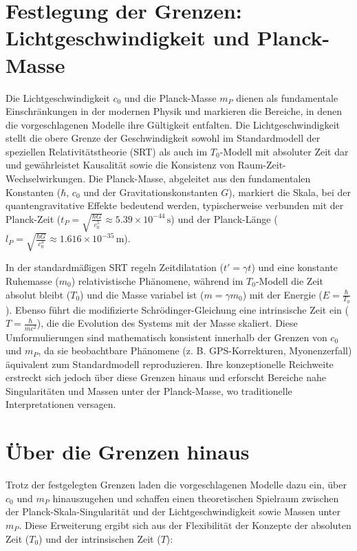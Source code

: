 \documentclass[a4paper,12pt]{article}
\begin{document}
	\section{Festlegung der Grenzen: Lichtgeschwindigkeit und Planck-Masse}
	Die Lichtgeschwindigkeit \( c_0 \) und die Planck-Masse \( m_P \) dienen als fundamentale Einschränkungen in der modernen Physik und markieren die Bereiche, in denen die vorgeschlagenen Modelle ihre Gültigkeit entfalten. Die Lichtgeschwindigkeit stellt die obere Grenze der Geschwindigkeit sowohl im Standardmodell der speziellen Relativitätstheorie (SRT) als auch im \( T_0 \)-Modell mit absoluter Zeit dar und gewährleistet Kausalität sowie die Konsistenz von Raum-Zeit-Wechselwirkungen. Die Planck-Masse, abgeleitet aus den fundamentalen Konstanten (\( \hbar \), \( c_0 \) und der Gravitationskonstanten \( G \)), markiert die Skala, bei der quantengravitative Effekte bedeutend werden, typischerweise verbunden mit der Planck-Zeit (\( t_P = \sqrt{\frac{\hbar G}{c_0^5}} \approx 5.39 \times 10^{-44} \, \text{s} \)) und der Planck-Länge (\( l_P = \sqrt{\frac{\hbar G}{c_0^3}} \approx 1.616 \times 10^{-35} \, \text{m} \)).
	
	In der standardmäßigen SRT regeln Zeitdilatation (\( t' = \gamma t \)) und eine konstante Ruhemasse (\( m_0 \)) relativistische Phänomene, während im \( T_0 \)-Modell die Zeit absolut bleibt (\( T_0 \)) und die Masse variabel ist (\( m = \gamma m_0 \)) mit der Energie (\( E = \frac{\hbar}{T_0} \)). Ebenso führt die modifizierte Schrödinger-Gleichung eine intrinsische Zeit ein (\( T = \frac{\hbar}{m c^2} \)), die die Evolution des Systems mit der Masse skaliert. Diese Umformulierungen sind mathematisch konsistent innerhalb der Grenzen von \( c_0 \) und \( m_P \), da sie beobachtbare Phänomene (z. B. GPS-Korrekturen, Myonenzerfall) äquivalent zum Standardmodell reproduzieren. Ihre konzeptionelle Reichweite erstreckt sich jedoch über diese Grenzen hinaus und erforscht Bereiche nahe Singularitäten und Massen unter der Planck-Masse, wo traditionelle Interpretationen versagen.
	
	\section{Über die Grenzen hinaus}
	Trotz der festgelegten Grenzen laden die vorgeschlagenen Modelle dazu ein, über \( c_0 \) und \( m_P \) hinauszugehen und schaffen einen theoretischen Spielraum zwischen der Planck-Skala-Singularität und der Lichtgeschwindigkeit sowie Massen unter \( m_P \). Diese Erweiterung ergibt sich aus der Flexibilität der Konzepte der absoluten Zeit (\( T_0 \)) und der intrinsischen Zeit (\( T \)):
	
\end{document}
